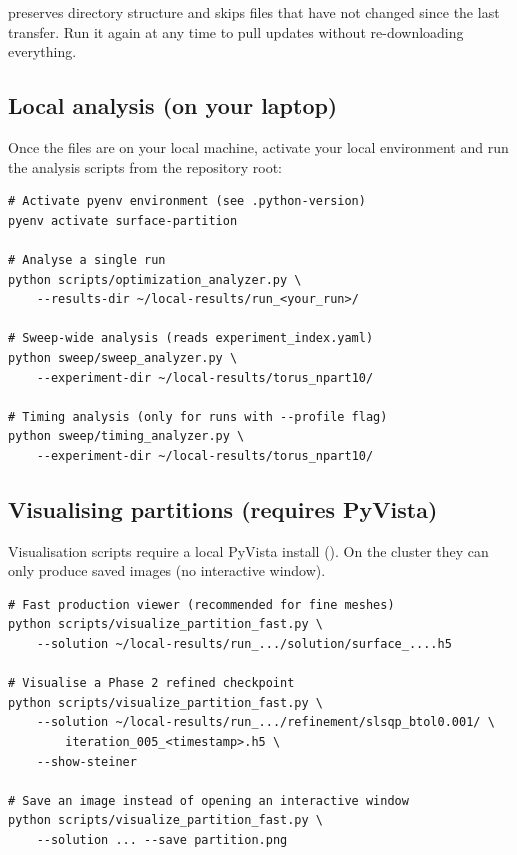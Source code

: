 \documentclass[11pt,a4paper]{article}
\begin{document}
\begin{notebox}
 preserves directory structure and skips files that have not
changed since the last transfer.  Run it again at any time to pull
updates without re-downloading everything.
\end{notebox}

\subsection{Local analysis (on your laptop)}

Once the files are on your local machine, activate your local environment
and run the analysis scripts from the repository root:

\begin{lstlisting}[style=shell]
# Activate pyenv environment (see .python-version)
pyenv activate surface-partition

# Analyse a single run
python scripts/optimization_analyzer.py \
    --results-dir ~/local-results/run_<your_run>/

# Sweep-wide analysis (reads experiment_index.yaml)
python sweep/sweep_analyzer.py \
    --experiment-dir ~/local-results/torus_npart10/

# Timing analysis (only for runs with --profile flag)
python sweep/timing_analyzer.py \
    --experiment-dir ~/local-results/torus_npart10/
\end{lstlisting}

\subsection{Visualising partitions (requires PyVista)}

Visualisation scripts require a local PyVista install ().
On the cluster they can only produce saved images (no interactive window).

\begin{lstlisting}[style=shell]
# Fast production viewer (recommended for fine meshes)
python scripts/visualize_partition_fast.py \
    --solution ~/local-results/run_.../solution/surface_....h5

# Visualise a Phase 2 refined checkpoint
python scripts/visualize_partition_fast.py \
    --solution ~/local-results/run_.../refinement/slsqp_btol0.001/ \
        iteration_005_<timestamp>.h5 \
    --show-steiner

# Save an image instead of opening an interactive window
python scripts/visualize_partition_fast.py \
    --solution ... --save partition.png
\end{lstlisting}
\end{document}

